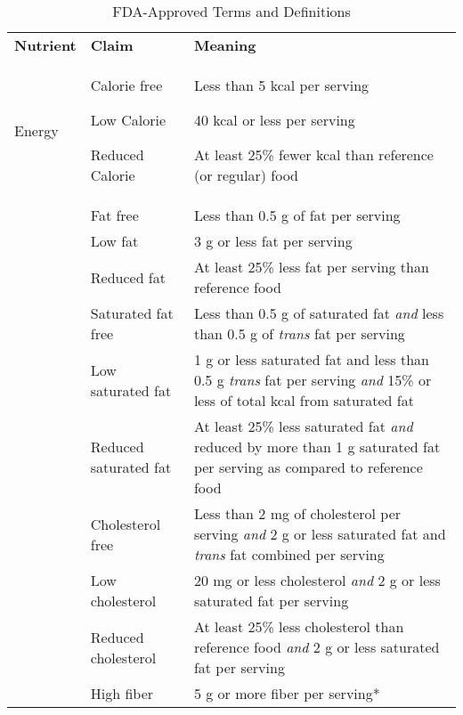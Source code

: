 \documentclass[title={Chapter 2}]{fdsn201notes}
\begin{document}
\begin{table}[H]
	\centering
	\begin{threeparttable}
		\caption{FDA-Approved Terms and Definitions}
		\label{tab:fda-approved-terms-and-definitions}
		\begin{tabular}{p{} p{} p{}}
			\rowcolor{rowdarkgreen}\textbf{Nutrient} & \textbf{Claim} & \textbf{Meaning}\\
			\rowcolor{rowlightgreen}Energy & Calorie free

			Low Calorie

			Reduced Calorie & Less than 5 kcal per serving

			40 kcal or less per serving

			At least 25\% fewer kcal than reference (or regular) food\\
			\rowcolor{rowmedgreen} & Fat free & Less than 0.5 g of fat per serving\\
			\rowcolor{rowmedgreen} & Low fat & 3 g or less fat per serving\\
			\rowcolor{rowmedgreen} & Reduced fat & At least 25\% less fat per serving than reference food\\
			\rowcolor{rowmedgreen} & Saturated fat free & Less than 0.5 g of saturated fat \emph{and} less than 0.5 g of \emph{trans} fat per serving\\
			\rowcolor{rowmedgreen} & Low saturated fat & 1 g or less saturated fat and less than 0.5 g \emph{trans} fat per serving \emph{and} 15\% or less of total kcal from saturated fat\\
			\rowcolor{rowmedgreen} & Reduced saturated fat & At least 25\% less saturated fat \emph{and} reduced by more than 1 g saturated fat per serving as compared to reference food\\
			\rowcolor{rowmedgreen} & Cholesterol free & Less than 2 mg of cholesterol per serving \emph{and} 2 g or less saturated fat and \emph{trans} fat combined per serving\\
			\rowcolor{rowmedgreen} & Low cholesterol & 20 mg or less cholesterol \emph{and} 2 g or less saturated fat per serving\\
			\rowcolor{rowmedgreen} \multirow[t]{-9}{0.11\textwidth}{Fat and Cholesterol} & Reduced cholesterol & At least 25\% less cholesterol than reference food \emph{and} 2 g or less saturated fat per serving\\
			\rowcolor{rowlightgreen} & High fiber & 5 g or more fiber per serving* \\

\end{tabular}
\end{threeparttable}
\end{table}
\end{document}
